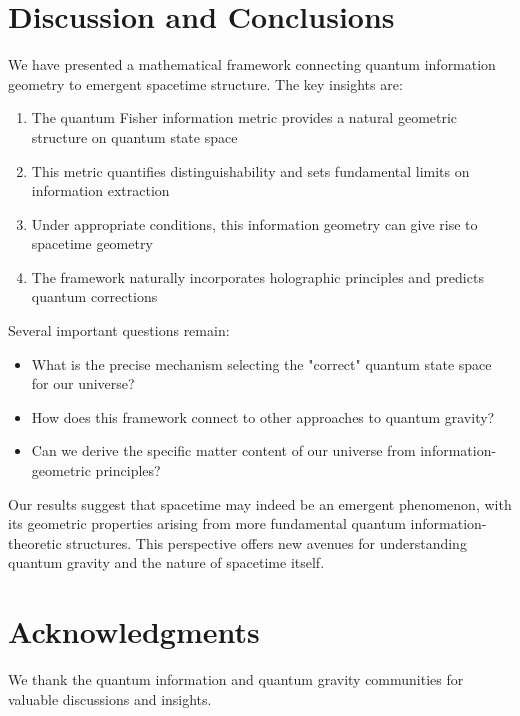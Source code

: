 \documentclass[12pt,a4paper]{article}
\begin{document}
\section{Discussion and Conclusions}

We have presented a mathematical framework connecting quantum information geometry to emergent spacetime structure. The key insights are:

\begin{enumerate}
\item The quantum Fisher information metric provides a natural geometric structure on quantum state space
\item This metric quantifies distinguishability and sets fundamental limits on information extraction
\item Under appropriate conditions, this information geometry can give rise to spacetime geometry
\item The framework naturally incorporates holographic principles and predicts quantum corrections
\end{enumerate}

Several important questions remain:
\begin{itemize}
\item What is the precise mechanism selecting the "correct" quantum state space for our universe?
\item How does this framework connect to other approaches to quantum gravity?
\item Can we derive the specific matter content of our universe from information-geometric principles?
\end{itemize}

Our results suggest that spacetime may indeed be an emergent phenomenon, with its geometric properties arising from more fundamental quantum information-theoretic structures. This perspective offers new avenues for understanding quantum gravity and the nature of spacetime itself.

\section*{Acknowledgments}

We thank the quantum information and quantum gravity communities for valuable discussions and insights.
\end{document}
